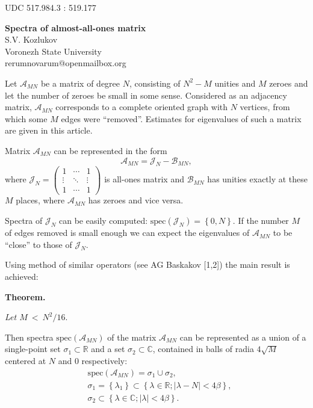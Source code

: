 \documentclass[11pt]{article}
\begin{document}
\small{UDC 517.984.3 : 519.177}

\begin{center}
\textbf{Spectra of almost-all-ones matrix}\\
\small{S.V. Kozlukov} \\
\small{Voronezh State University} \\
\small{rerumnovarum@openmailbox.org} \\
\end{center}

Let \( \mathscr{A}_{MN} \) be a matrix of degree \( N \),
consisting of \( N^2 - M \) unities and \( M \) zeroes
and let the number of zeroes be small in some sense.
Considered as an adjacency matrix,
\( \mathscr{A}_{MN} \) corresponds to a complete oriented graph
with \( N \) vertices,
from which some \( M \) edges were ``removed''.
Estimates for eigenvalues of such a matrix are given in this article.

Matrix \( \mathscr{A}_{MN} \) can be represented in the form
\[
    \mathscr{A}_{MN} = \mathscr{J}_{N} - \mathscr{B}_{MN},
    \]
where \(
\mathscr{J}_{N} =
\begin{pmatrix}1 & \cdots & 1 \\
\vdots & \ddots & \vdots \\
1 & \cdots & 1
\end{pmatrix} \) is all-ones matrix
and \( \mathscr{B}_{MN} \) has unities
exactly at these \( M \) places,
where \( \mathscr{A}_{MN} \) has zeroes and vice versa.

Spectra of \( \mathscr{J}_{N} \) can be easily computed:
\( \mathrm{spec}\left({\mathscr{J}_{N}}\right) = \left\{0, N \right\} \).
If the number \( M \) of edges removed
is small enough
we can expect the eigenvalues of
\( \mathscr{A}_{MN} \) to be ``close'' to those of \( \mathscr{J}_{N} \).

Using method of similar operators (see AG Baskakov [1,2])
the main result is achieved:

\textbf{Theorem.}

{\it
Let
\(M~<~\displaystyle{N^2/16}. \)

Then spectra \( \mathrm{spec}\left({\mathscr{A}_{MN}}\right) \)
of the matrix \( \mathscr{A}_{MN} \)
can be represented as a union of
a single-point set \( \sigma_1 \subset \mathbb{R} \)
and a set \( \sigma_2 \subset \mathbb{C} \),
contained in balls of radia \( 4\sqrt{M} \)
centered at \( N \) and \( 0 \) respectively:
\begin{equation*}\begin{aligned}
    & \mathrm{spec}\left({\mathscr{A}_{MN}}\right) = \sigma_1 \cup \sigma_2, \\
    & \sigma_1 = \left\{ \lambda_1 \right\}
      \subset \left\{ \lambda\in\mathbb{R}; \lvert \lambda - N\rvert < 4\beta \right\}, \\
    & \sigma_2 \subset \left\{\lambda\in\mathbb{C}; \lvert\lambda\rvert <4\beta \right\}. \\
\end{aligned}\end{equation*}
}
\end{document}
